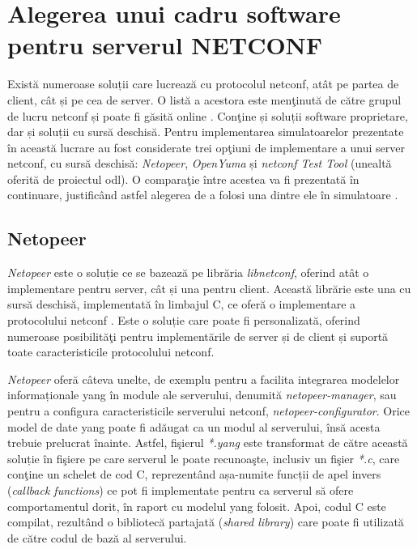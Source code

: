 \section{Alegerea unui cadru software pentru serverul NETCONF}

Există numeroase soluții care lucrează cu protocolul \gls{netconf}, atât pe partea de client, cât și pe cea de server. O listă a acestora este menţinută de către grupul de lucru \gls{netconf} și poate fi găsită online \cite{netconfwiki}. Conţine și soluții software proprietare, dar și soluții cu sursă deschisă. Pentru implementarea simulatoarelor prezentate în această lucrare au fost considerate trei opţiuni de implementare a unui server \gls{netconf}, cu sursă deschisă: \textit{Netopeer}, \textit{OpenYuma} și \textit{\gls{netconf} Test Tool} (unealtă oferită de proiectul \gls{odl}). O comparaţie între acestea va fi prezentată în continuare, justificând astfel alegerea de a folosi una dintre ele în simulatoare \cite{stancu2016comparison}.

\subsection{Netopeer}

\textit{Netopeer} este o soluție ce se bazează pe librăria \textit{libnetconf}, oferind atât o implementare pentru server, cât și una pentru client. Această librărie este una cu sursă deschisă, implementată în limbajul C, ce oferă o implementare a protocolului \gls{netconf} \cite{krejci2013building}. Este o soluție care poate fi personalizată, oferind numeroase posibilităţi pentru implementările de server și de client și suportă toate caracteristicile protocolului \gls{netconf}.

\textit{Netopeer} oferă câteva unelte, de exemplu pentru a facilita integrarea modelelor informaționale \gls{yang} în module ale serverului, denumită \textit{netopeer-manager}, sau pentru a configura caracteristicile serverului \gls{netconf}, \textit{netopeer-configurator}. Orice model de date \gls{yang} poate fi adăugat ca un modul al serverului, însă acesta trebuie prelucrat înainte. Astfel, fişierul \textit{*.yang} este transformat de către această soluție în fişiere pe care serverul le poate recunoaşte, inclusiv un fişier \textit{*.c}, care conţine un schelet de cod C, reprezentând așa-numite funcții de apel invers (\textit{callback functions}) ce pot fi implementate pentru ca serverul să ofere comportamentul dorit, în raport cu modelul \gls{yang} folosit. Apoi, codul C este compilat, rezultând o bibliotecă partajată (\textit{shared library}) care poate fi utilizată de către codul de bază al serverului.

